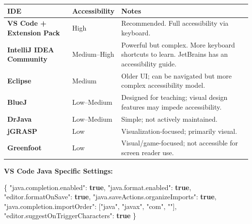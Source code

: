 \documentclass[
  justified,
  openright,
]{tufte-book}
\newcommand{\KeywordTok}[1]{\textcolor{CodeKeyword}{\textbf{#1}}}  %
\newcommand{\StringTok}[1]{\textcolor{CodeString}{#1}}              %
\newcommand{\CodeFuncTok}[1]{\textcolor{CodeKeyword}{#1}}           %
\newcommand{\CodeTypeTok}[1]{\textcolor{CodeType}{#1}}              %
\newenvironment{Shaded}{%
  \begin{mdframed}[style=TufteCode]%
}{%
  \end{mdframed}%
}
\begin{document}
\begin{fullwidth}{\def\LTcaptype{none} %
\begin{longtable}[]{@{}
  >{\raggedright\arraybackslash}p{}
  >{\raggedright\arraybackslash}p{}
  >{\raggedright\arraybackslash}p{}@{}}
\toprule\noalign{}
\begin{minipage}[b]{\linewidth}\raggedright
IDE
\end{minipage} & \begin{minipage}[b]{\linewidth}\raggedright
Accessibility
\end{minipage} & \begin{minipage}[b]{\linewidth}\raggedright
Notes
\end{minipage} \\
\midrule\noalign{}
\endhead
\bottomrule\noalign{}
\endlastfoot
\textbf{VS Code + Extension Pack} & High & Recommended. Full
accessibility via keyboard. \\
\textbf{IntelliJ IDEA Community} & Medium--High & Powerful but complex.
More keyboard shortcuts to learn. JetBrains has an accessibility
guide. \\
\textbf{Eclipse} & Medium & Older UI; can be navigated but more complex
accessibility model. \\
\textbf{BlueJ} & Low--Medium & Designed for teaching; visual design
features may impede accessibility. \\
\textbf{DrJava} & Low--Medium & Simple; not actively maintained. \\
\textbf{jGRASP} & Low & Visualization-focused; primarily visual. \\
\textbf{Greenfoot} & Low & Visual/game-focused; not accessible for
screen reader use. \\
\end{longtable}
}
\end{fullwidth}

\textbf{VS Code Java Specific Settings:}

\begin{Shaded}
\begin{Highlighting}[]
\CodeFuncTok{\{}
  \CodeTypeTok{"java.completion.enabled"}\CodeFuncTok{:} \KeywordTok{true}\CodeFuncTok{,}
  \CodeTypeTok{"java.format.enabled"}\CodeFuncTok{:} \KeywordTok{true}\CodeFuncTok{,}
  \CodeTypeTok{"editor.formatOnSave"}\CodeFuncTok{:} \KeywordTok{true}\CodeFuncTok{,}
  \CodeTypeTok{"java.saveActions.organizeImports"}\CodeFuncTok{:} \KeywordTok{true}\CodeFuncTok{,}
  \CodeTypeTok{"java.completion.importOrder"}\CodeFuncTok{:} [\StringTok{"java"}, \StringTok{"javax"}, \StringTok{"com"}, \StringTok{""}]\CodeFuncTok{,}
  \CodeTypeTok{"editor.suggestOnTriggerCharacters"}\CodeFuncTok{:} \KeywordTok{true}
\CodeFuncTok{\}}
\end{Highlighting}
\end{Shaded}
\end{document}
